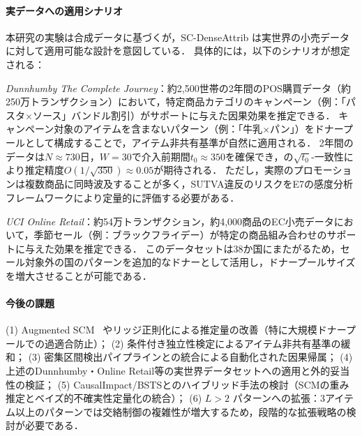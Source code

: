 \paragraph{実データへの適用シナリオ}
本研究の実験は合成データに基づくが，SC-DenseAttrib は実世界の小売データに対して適用可能な設計を意図している．
具体的には，以下のシナリオが想定される：

\emph{Dunnhumby The Complete Journey}：約2,500世帯の2年間のPOS購買データ（約250万トランザクション）において，特定商品カテゴリのキャンペーン（例：「パスタ$\times$ソース」バンドル割引）がサポートに与えた因果効果を推定できる．
キャンペーン対象のアイテムを含まないパターン（例：「牛乳$\times$パン」）をドナープールとして構成することで，アイテム非共有基準が自然に適用される．
2年間のデータは$N \approx 730$日，$W=30$で介入前期間$t_0 \approx 350$を確保でき，の$\sqrt{t_0}$-一致性により推定精度$O(1/\sqrt{350}) \approx 0.05$が期待される．
ただし，実際のプロモーションは複数商品に同時波及することが多く，SUTVA違反のリスクをE7の感度分析フレームワークにより定量的に評価する必要がある．

\emph{UCI Online Retail}：約54万トランザクション，約4,000商品のEC小売データにおいて，季節セール（例：ブラックフライデー）が特定の商品組み合わせのサポートに与えた効果を推定できる．
このデータセットは38か国にまたがるため，セール対象外の国のパターンを追加的なドナーとして活用し，ドナープールサイズを増大させることが可能である．

\paragraph{今後の課題}
(1) Augmented SCM~\cite{benmichael2021augmented} やリッジ正則化による推定量の改善（特に大規模ドナープールでの過適合防止）；
(2) 条件付き独立性検定によるアイテム非共有基準の緩和；
(3) 密集区間検出パイプラインとの統合による自動化された因果帰属；
(4) 上述のDunnhumby・Online Retail等の実世界データセットへの適用と外的妥当性の検証；
(5) CausalImpact/BSTSとのハイブリッド手法の検討（SCMの重み推定とベイズ的不確実性定量化の統合）；
(6) $L > 2$ パターンへの拡張：3アイテム以上のパターンでは交絡制御の複雑性が増大するため，段階的な拡張戦略の検討が必要である．

